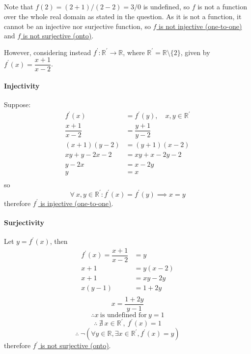 \documentclass[10pt]{article} %
\begin{document}
\subsection{}
Note that $f(2) = (2+1) / (2-2) = 3/0$ is undefined, so $f$ is not a function over the whole real domain as stated in the question. As it is not a function, it cannot be an injective nor surjective function, so \underline{$f$ is not injective (one-to-one)} and \underline{$f$ is not surjective (onto)}. 

However, considering instead $f^\prime:\mathbb{R}^\prime \to \mathbb{R}$, where $\mathbb{R}^\prime = \mathbb{R} \setminus \{2\}$, given by $f^\prime(x)=\dfrac{x+1}{x-2}$.

\paragraph{Injectivity}
Suppose:
\[
  \begin{aligned}
    f^\prime(x) &= f^\prime(y), \quad x,y \in \mathbb{R}^\prime \\
    \dfrac{x+1}{x-2} &= \dfrac{y+1}{y-2}\\
    (x+1)(y-2) &= (y+1)(x-2) \\
    xy + y -2x -2 &= xy +x -2y -2 \\
    y-2x &= x - 2y \\
    y &= x \\
  \end{aligned}
\]
so 
\[
\forall \ x,y \in \mathbb{R}^\prime : f^\prime(x) = f^\prime(y) \implies x = y
\]
therefore \underline{$f^\prime$ is injective (one-to-one)}.

\paragraph{Surjectivity} Let $y = f^\prime(x)$, then
\[
  \begin{aligned}
    f^\prime(x) = \dfrac{x+1}{x-2} & = y \\
    x+1 &= y(x-2)\\
    x+1 &= xy - 2y \\
    x(y - 1) &= 1+2y \\
    \end{aligned}
\]
\[ x = \dfrac{1+2y}{y-1} \]
\[\therefore x \ \text{is undefined for} \ y = 1 \]
\[\therefore \ \nexists \ x \in \mathbb{R}^\prime , \ f^\prime(x) = 1\]
\[\therefore \ \neg \left(\forall y \in \mathbb{R}, \exists x \in \mathbb{R}^\prime, f^\prime(x) = y \right) \]
therefore \underline{$f^\prime$ is not surjective (onto)}.
\end{document}
